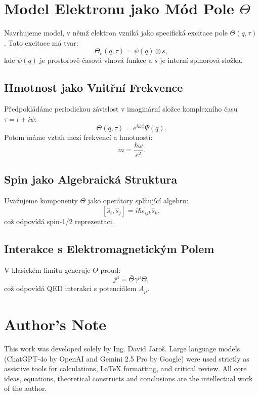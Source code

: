 \documentclass{article}
\begin{document}
\section*{Model Elektronu jako Mód Pole \(\Theta\)}

Navrhujeme model, v němž elektron vzniká jako specifická excitace pole \(\Theta(q, \tau)\). Tato excitace má tvar:
\[
\Theta_e(q, \tau) = \psi(q) \otimes s,
\]
kde \(\psi(q)\) je prostorově-časová vlnová funkce a \(s\) je interní spinorová složka.

\subsection*{Hmotnost jako Vnitřní Frekvence}
Předpokládáme periodickou závislost v imaginární složce komplexního času \(\tau = t + i\psi\):
\[
\Theta(q, \tau) = e^{i\omega \psi} \Psi(q).
\]
Potom máme vztah mezi frekvencí a hmotností:
\[
m = \frac{\hbar \omega}{c^2}.
\]

\subsection*{Spin jako Algebraická Struktura}
Uvažujeme komponenty \(\Theta\) jako operátory splňující algebru:
\[
[\hat{s}_i, \hat{s}_j] = i \hbar \epsilon_{ijk} \hat{s}_k,
\]
což odpovídá spin-1/2 reprezentaci.

\subsection*{Interakce s Elektromagnetickým Polem}
V klasickém limitu generuje \(\Theta\) proud:
\[
j^\mu = \bar{\Theta} \gamma^\mu \Theta,
\]
což odpovídá QED interakci s potenciálem \(A_\mu\).


\section*{Author's Note}

This work was developed solely by Ing. David Jaroš.  
Large language models (ChatGPT-4o by OpenAI and Gemini 2.5 Pro by Google) were used strictly as assistive tools for calculations, LaTeX formatting, and critical review.  
All core ideas, equations, theoretical constructs and conclusions are the intellectual work of the author.
\end{document}
